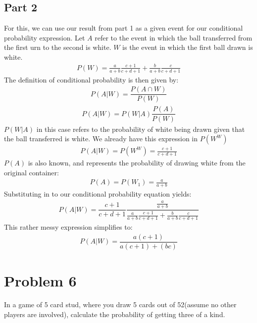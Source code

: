 \documentclass{article}
\begin{document}
\subsection*{Part 2}
For this, we can use our result from part 1 as a given event for our conditional probability expression.
Let $A$ refer to the event in which the ball transferred from the first urn to the second is white. $W$ is the event in which the first ball drawn is white.
\begin{align*}
P(W) = \frac{a}{a+b}  \frac{c+1}{c+d+1} + \frac{b}{a+b} \frac{c}{c+d+1}
\end{align*}
The definition of conditional probability is then given by:
\begin{align*}
P(A|W) = \dfrac{P(A\cap W)}{P(W)}
\end{align*}
\begin{align*}
P(A|W) = P(W|A)\dfrac{P(A)}{P(W)}
\end{align*}
$P(W|A)$ in this case refers to the probability of white being drawn given that the ball transferred is white. We already have this expression in $P(W^W)$
\begin{align*}
P(A|W) = P(W^W) = \frac{c+1}{c+d+1}
\end{align*}
$P(A)$ is also known, and represents the probability of drawing white from the original container:
\begin{align*}
P(A) = P(W_1) = \frac{a}{a+b}
\end{align*}
Substituting in to our conditional probability equation yields:
\begin{align*}
P(A|W) = \dfrac{c+1}{c+d+1}\dfrac{\frac{a}{a+b}}{\frac{a}{a+b}  \frac{c+1}{c+d+1} + \frac{b}{a+b} \frac{c}{c+d+1}}
\end{align*}
This rather messy expression simplifies to:
\begin{align*}
\boxed{P(A|W) = \dfrac{a(c+1)}{a(c+1)+(b c)}}
\end{align*}

\clearpage
\section*{Problem 6}
In a game of 5 card stud, where you draw 5 cards out of 52(assume no other players are involved), calculate the probability of getting three of a kind.
\end{document}
